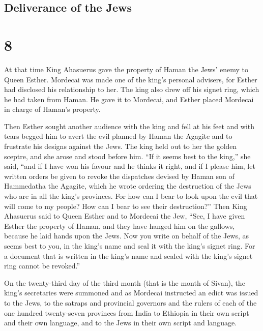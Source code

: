 \hypertarget{deliverance-of-the-jews}{%
\subsection{Deliverance of the Jews}\label{deliverance-of-the-jews}}

\hypertarget{section-7}{%
\section{8}\label{section-7}}

 At that time King Ahasuerus gave the property of Haman the
Jews' enemy to Queen Esther. Mordecai was made one of the king's
personal advisers, for Esther had disclosed his relationship to her.
 The king also drew off his signet ring, which he had taken
from Haman. He gave it to Mordecai, and Esther placed Mordecai in charge
of Haman's property.

 Then Esther sought another audience with the king and fell
at his feet and with tears begged him to avert the evil planned by Haman
the Agagite and to frustrate his designs against the Jews. 
The king held out to her the golden sceptre, and she arose and stood
before him.  ``If it seems best to the king,'' she said,
``and if I have won his favour and he thinks it right, and if I please
him, let written orders be given to revoke the dispatches devised by
Haman son of Hammedatha the Agagite, which he wrote ordering the
destruction of the Jews who are in all the king's provinces.
 For how can I bear to look upon the evil that will come to
my people? How can I bear to see their destruction?''  Then
King Ahasuerus said to Queen Esther and to Mordecai the Jew, ``See, I
have given Esther the property of Haman, and they have hanged him on the
gallows, because he laid hands upon the Jews.  Now you write
on behalf of the Jews, as seems best to you, in the king's name and seal
it with the king's signet ring. For a document that is written in the
king's name and sealed with the king's signet ring cannot be revoked.''

 On the twenty-third day of the third month (that is the
month of Sivan), the king's secretaries were summoned and as Mordecai
instructed an edict was issued to the Jews, to the satraps and
provincial governors and the rulers of each of the one hundred
twenty-seven provinces from India to Ethiopia in their own script and
their own language, and to the Jews in their own script and language.

